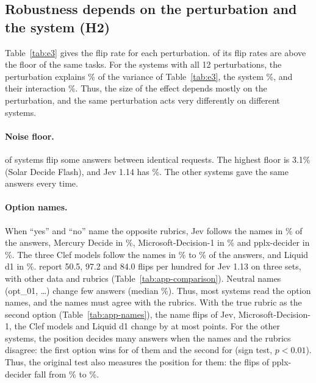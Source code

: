 \documentclass[11pt]{article}
\begin{document}
\subsection{Robustness depends on the perturbation and the system (H2)}
\label{sec:robustness}

Table~\ref{tab:e3} gives the flip rate for each perturbation. \nCellsAboveFloor{} of its \nCellsThree{} flip rates are above the floor of the same tasks. For the \nVarSystemsThree{} systems with all 12 perturbations, the perturbation explains \varFamThree\% of the variance of Table~\ref{tab:e3}, the system \varSystemThree\%, and their interaction \varRestThree\%. Thus, the size of the effect depends mostly on the perturbation, and the same perturbation acts very differently on different systems.

\paragraph{Noise floor.} \nNondeterministic{} of \nEThree{} systems flip some answers between identical requests. The highest floor is 3.1\% (Solar Decide Flash), and Jev 1.14 has \repeatJev\%. The other \nDeterministic{} systems gave the same answers every time.

\paragraph{Option names.} When ``yes'' and ``no'' name the opposite rubrics, Jev follows the names in \nameswapJev\% of the answers, Mercury Decide in \nameswapMercury\%, Microsoft-Decision-1 in \nameswapMsft\% and pplx-decider in \nameswapPplx\%. The three Clef models follow the names in \nameswapClefMin\% to \nameswapClefMax\% of the answers, and Liquid d1 in \nameswapDOne\%. \citet{rafe2026benchmarking} report 50.5, 97.2 and 84.0 flips per hundred for Jev 1.13 on three sets, with other data and rubrics (Table~\ref{tab:app-comparison}). Neutral names (opt\_01, \ldots) change few answers (median \codesMedian\%). Thus, most systems read the option names, and the names must agree with the rubrics. With the true rubric as the second option (Table~\ref{tab:app-names}), the name flips of Jev, Microsoft-Decision-1, the Clef models and Liquid d1 change by at most \namesStableDiffMax{} points. For the other \nNamesOther{} systems, the position decides many answers when the names and the rubrics disagree: the first option wins for \nPosFirstWins{} of them and the second for \nPosSecondWins{} (sign test, $p < 0.01$). Thus, the original test also measures the position for them: the flips of pplx-decider fall from \nameswapPplx\% to \namesSecondPplx\%.
\end{document}
